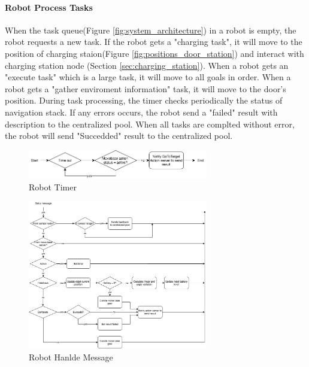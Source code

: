 \paragraph{Robot Process Tasks}
When the task queue(Figure \ref{fig:system_architecture}) in a robot is empty, the robot requests a new task. If the robot gets a "charging task", it will move to the position of charging staion(Figure \ref{fig:positions_door_station}) and interact with charging station node (Section \ref{sec:charging_station}).
When a robot gets an "execute task" which is a large task, it will move to all goals in order.
When a robot gets a "gather enviroment information" task, it will move to the door's position.
During task processing, the timer checks periodically the status of navigation stack. If any errors occurs, the robot send a "failed" result with description to the centralized pool.  
When all tasks are complted without error, the robot will send "Succedded" result to the centralized pool.


\begin{figure}[htbp]
    \centering
    \includegraphics[width = 0.7\textwidth]{content/images/ch4/robot_timer.drawio.png}
    \caption{Robot Timer}
    \label{fig:robot_timer}
\end{figure}

\begin{figure}[htbp]
    \centering
    \includegraphics[width = 0.7\textwidth]{content/images/ch4/robot_message.drawio.png}
    \caption{Robot Hanlde Message}
    \label{fig:robot_handle_message}
\end{figure}

